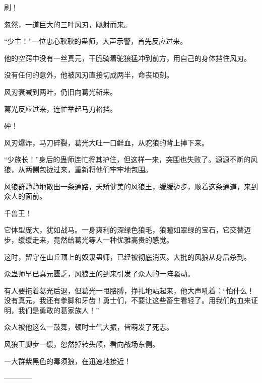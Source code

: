 \begin{this_body}
刷！

忽然，一道巨大的三叶风刃，飚射而来。

“少主！”一位忠心耿耿的蛊师，大声示警，首先反应过来。

他的空窍中没有一丝真元，干脆骑着驼狼猛冲到前方，用自己的身体挡住风刃。

没有任何的意外，他被风刃直接切成两半，命丧顷刻。

风刃衰减到两叶，仍旧向葛光斩来。

葛光反应过来，连忙举起马刀格挡。

砰！

风刃爆炸，马刀碎裂，葛光大吐一口鲜血，从驼狼的背上掉下来。

“少族长！”身后的蛊师连忙将其护住，但这样一来，突围也失败了。源源不断的风狼，从两侧包拢过来，重新将他们牢牢地包围。

风狼群静静地散出一条通路，夭矫健美的风狼王，缓缓迈步，顺着这条通道，来到众人的面前。

千兽王！

它体型庞大，犹如战马。一身爽利的深绿色狼毛，狼瞳如翠绿的宝石，它交替迈步，缓缓走来，竟然给葛光等人一种优雅高贵的感觉。

这时，留守在山丘顶上的奴隶蛊师，已经被彻底消灭。大批的风狼从身后杀到。

众蛊师早已真元匮乏，风狼王的到来引发了众人的一阵骚动。

有人要拖着葛光后退，但葛光一甩胳膊，挣扎地站起来，他大声吼着：“怕什么！没有真元，我还有拳脚和牙齿！勇士们，不要让这些畜生看轻了。用我们的血来证明，我们是勇敢的葛家族人！”

众人被他这么一鼓舞，顿时士气大振，皆萌发了死志。

风狼王脚步一缓，忽然掉转头颅，看向战场东侧。

一大群紫黑色的毒须狼，在迅速地接近！

------------

\end{this_body}

